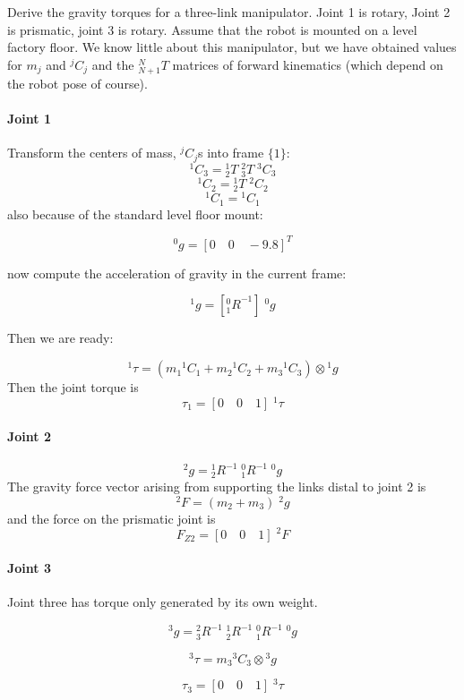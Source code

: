 \begin{ExampleSmall}
Derive the gravity torques for a three-link manipulator.  Joint 1 is rotary, Joint 2 is prismatic, joint 3 is rotary.  Assume that the robot is mounted on a level factory floor.
We know little about this manipulator, but we have obtained values for $m_j$ and ${^jC_j}$ and the ${^N_{N+1}T}$  matrices of forward kinematics (which depend on the robot pose of course).

\paragraph{Joint 1}
Transform the centers of mass,  $^jC_j$s into frame $\{1\}$:
\[
{^1C_3} = {^1_2T}\;{^2_3T}\;{^3C_3}
\]
\[
{^1C_2} = {^1_2T}\;{^2C_2}
\]
\[
{^1C_1} = {^1C_1}
\]
also because of the standard level floor mount:

\[
^0g = [ 0 \quad 0 \quad -9.8]^T
\]

now compute the acceleration of gravity in the current frame:

\[
{^1g} = \left [{^0_1R}^{-1} \right ] \; {^0g}
\]

Then we are ready:

\[
{^1\tau} = \left ( m_1{^1C_1}+m_2{^1C_2}+m_3{^1C_3}\right ) \otimes {^1g}
\]
Then the joint torque is
\[
\tau_1 = [0\quad0\quad1]\;{^1\tau}
\]

\paragraph{Joint 2}


\[
^2g =   {^1_2R^{-1}}\; {^0_1R^{-1}}\;{^0g}
\]
The gravity force vector arising from supporting the links distal to joint 2 is
\[
{^2F}= \left( m_2+m_3\right)\;{^2g}
\]
and the force on the prismatic joint is
\[
F_{Z2} =  [0\quad0\quad1]\;{^2F}
\]

\paragraph{Joint 3}
Joint three has torque only generated by its own weight.

\[
^3g =   {^2_3R^{-1}}\;{^1_2R^{-1}}\; {^0_1R^{-1}}\;{^0g}
\]

\[
^3\tau = m_3{^3C_3}\otimes {^3g}
\]

\[
\tau_3 = [0\quad0\quad1]\;{^3\tau}
\]


\end{ExampleSmall}



